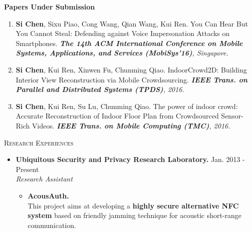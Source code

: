 \documentclass[letter]{article}
\newcommand{\heading}[1]{\item \large \textsc{#1} \normalsize}
\newenvironment{experience}[4]{
\item \textbf{#1.} \hfill #3 - #4 \\
\emph{#2}
}{
}
\newcommand{\publication}[4]{\item #1. #2. \emph{#3.} #4}
\begin{document}
\begin{description}
\begin{enumerate}[{P-}1.]
\end{enumerate}

\textbf{Papers Under Submission}
\begin{enumerate}[{U-}1.]
\publication{\textbf{Si Chen}, Sixu Piao, Cong Wang, Qian Wang, Kui Ren} {You Can Hear But You Cannot Steal: Defending against Voice Impersonation Attacks on Smartphones}  {\textbf{The 14th ACM International Conference on Mobile Systems, Applications, and Services (MobiSys'16)}, Singapore} \\

\publication{\textbf{Si Chen}, Kui Ren, Xinwen Fu, Chunming Qiao} {IndoorCrowd2D: Building Interior View Reconstruction via Mobile Crowdsourcing}
{\textbf{IEEE Trans. on Parallel and Distributed Systems (TPDS)}, 2016}\\

\publication{\textbf{Si Chen}, Kui Ren, Su Lu, Chunming Qiao} {The power of indoor crowd: Accurate Reconstruction of Indoor Floor Plan from Crowdsourced Sensor-Rich Videos}
{\textbf{IEEE Trans. on Mobile Computing (TMC)}, 2016}\\




\end{enumerate}

\heading{Research Experiences}

\begin{itemize}

\begin{experience}
{Ubiquitous Security and Privacy Research Laboratory}
{Research Assistant}
{Jan. 2013}{Present}
\begin{itemize}


\item \textbf{AcousAuth.} \\
This project aims at developing a \textbf{highly secure alternative NFC system} based on friendly jamming technique for acoustic short-range communication. 
\begin{itemize}


\end{itemize}
\end{itemize}
\end{experience}
\end{itemize}
\end{description}
\end{document}
